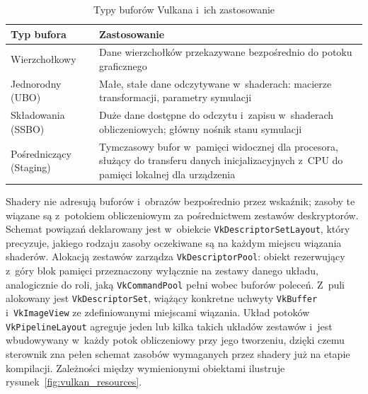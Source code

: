 \begin{table}[ht]
\centering
\caption{Typy buforów Vulkana i~ich zastosowanie}
\label{tab:buffer_types}
\small
\begin{tabular}{lp{9.5cm}}
\toprule
Typ bufora & Zastosowanie \\
\midrule
Wierzchołkowy & Dane wierzchołków przekazywane bezpośrednio do potoku graficznego \\ 
\addlinespace
Jednorodny (UBO) & Małe, stałe dane odczytywane w~shaderach: macierze transformacji, parametry symulacji \\
\addlinespace
Składowania (SSBO) & Duże dane dostępne do odczytu i~zapisu w~shaderach obliczeniowych; główny nośnik stanu symulacji \\
\addlinespace
Pośredniczący (Staging) & Tymczasowy bufor w~pamięci widocznej dla procesora, służący do transferu danych inicjalizacyjnych z~CPU do pamięci lokalnej dla urządzenia \\
\bottomrule
\end{tabular}
\end{table}

Shadery nie adresują buforów i~obrazów bezpośrednio przez wskaźnik; zasoby te wiązane są
z~potokiem obliczeniowym za pośrednictwem zestawów deskryptorów.
Schemat powiązań deklarowany jest w~obiekcie \texttt{VkDescriptorSetLayout}, który precyzuje,
jakiego rodzaju zasoby oczekiwane są na każdym miejscu wiązania shaderów.
Alokacją zestawów zarządza \texttt{VkDescriptorPool}: obiekt rezerwujący z~góry blok pamięci
przeznaczony wyłącznie na zestawy danego układu, analogicznie do roli,
jaką \texttt{VkCommandPool} pełni wobec buforów poleceń.
Z~puli alokowany jest \texttt{VkDescriptorSet}, wiążący konkretne uchwyty
\texttt{VkBuffer} i~\texttt{VkImageView} ze zdefiniowanymi miejscami wiązania.
Układ potoków \texttt{VkPipelineLayout} agreguje jeden lub kilka takich układów zestawów
i~jest wbudowywany w~każdy potok obliczeniowy przy jego tworzeniu, dzięki czemu sterownik
zna pełen schemat zasobów wymaganych przez shadery już na etapie kompilacji.
Zależności między wymienionymi obiektami ilustruje rysunek~\ref{fig:vulkan_resources}.

